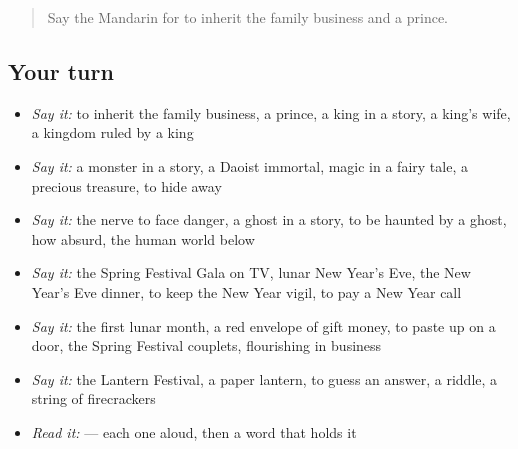 \label{lesson:ZH-R335-review-330-335}



\begin{quote}
Say the Mandarin for to inherit the family business and a prince.
\end{quote}

\subsection*{Your turn}
\begin{itemize}
\raggedright
  \item \emph{Say it:} to inherit the family business, a prince, a king in a story, a king's wife, a kingdom ruled by a king
  \item \emph{Say it:} a monster in a story, a Daoist immortal, magic in a fairy tale, a precious treasure, to hide away
  \item \emph{Say it:} the nerve to face danger, a ghost in a story, to be haunted by a ghost, how absurd, the human world below
  \item \emph{Say it:} the Spring Festival Gala on TV, lunar New Year's Eve, the New Year's Eve dinner, to keep the New Year vigil, to pay a New Year call
  \item \emph{Say it:} the first lunar month, a red envelope of gift money, to paste up on a door, the Spring Festival couplets, flourishing in business
  \item \emph{Say it:} the Lantern Festival, a paper lantern, to guess an answer, a riddle, a string of firecrackers
  \item \emph{Read it:}    — each one aloud, then a word that holds it
\end{itemize}

